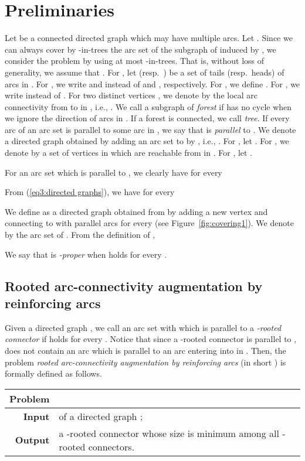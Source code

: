 \documentclass[11pt]{article}
\newcounter{ni}
\theoremstyle{plain}
\begin{document}
\section{Preliminaries}
\label{Preliminaries}

Let  be a connected directed graph which may have multiple arcs. 
Let . 
Since we can always cover by
 -in-trees the arc set of the subgraph
of  induced by , 
we consider the problem by using at most
 -in-trees. That is,
without loss of generality, we assume that .
For , let  (resp.~) be a set of tails (resp.~heads) of arcs in . 
For , we write  and  instead of  and , 
respectively. 
For ,
we define .
For , we write  instead of . 
For two distinct vertices , we denote by  the 
local arc connectivity from  to  in , i.e.,
. 
We call a subgraph  of  {\it forest} if 
 has no cycle when we ignore the direction of arcs in . 
If a forest  is connected, we call  {\it tree}.  
If every arc of an arc set  is parallel to some arc in , 
we say that  is {\it parallel} to . 
We denote a directed graph obtained by adding an arc set  to  by , 
i.e., . 
For , let . 
For , we denote by  a set of vertices in
 which are reachable from  in . 
For ,
let .

For an arc set  which is parallel to , we clearly have
for every  

From (\ref{eq3:directed graphs}), we have
for every 


We define  as a directed graph  obtained from  by
adding a new vertex  and connecting  to  with
 parallel arcs for every  (see Figure~\ref{fig:covering1}).
We denote by  the arc set of .  
From the definition of , 

We say that  is {\it -proper} when 
 holds for every . 

\subsection{Rooted arc-connectivity augmentation by reinforcing arcs}

Given a directed graph  , 
we call an arc set  with  which is parallel to  
a {\it -rooted connector} 
if  holds for every .
Notice that since a -rooted connector  is parallel to , 
 does not contain an arc which is parallel to an arc entering into  in . 
Then, the problem {\it rooted arc-connectivity augmentation by reinforcing arcs} 
(in short ) is formally defined as follows.
\begin{center}
\begin{tabularx}{150mm}{rX}
\hline
{\bf Problem} &  \\
\hline 
{\bf Input} &  of a directed graph ;\\
{\bf Output} &
a -rooted connector  whose size is minimum among all 
-rooted connectors. \\
\hline
\end{tabularx}
\end{center}
\end{document}
